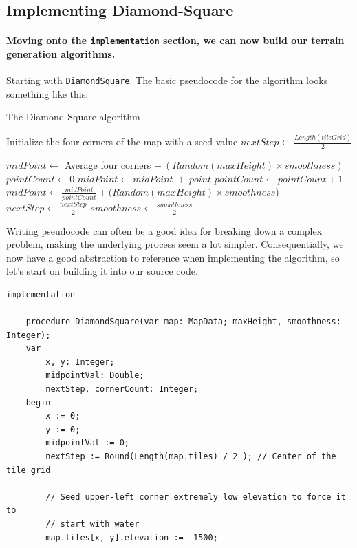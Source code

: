\documentclass{article}
\begin{document}
\pagebreak


\subsection{Implementing Diamond-Square}

\paragraph{Moving onto the \texttt{implementation} section, we can now build our terrain generation algorithms.} Starting with \texttt{DiamondSquare}. The basic pseudocode for the algorithm looks something like this:

\begin{algorithm}[H]
\caption{The Diamond-Square algorithm}
\begin{algorithmic}
	\State Initialize the four corners of the map with a seed value
	\State $nextStep \gets \frac{Length(tileGrid)}{2}$
	
		  
			\State $midPoint \gets$ Average four corners $+ \ (Random(maxHeight) \times smoothness)$
		\EndFor
		 
				\State $pointCount \gets 0$
					\State $midPoint \gets midPoint \ + \ point$
					\State $pointCount\gets pointCount+1$
				\EndIf
			\EndFor
			\State $midPoint \gets \frac{midPoint}{pointCount} + (Random(maxHeight) \times smoothness$)
		\EndFor
		\State $nextStep \gets \frac{nextStep}{2}$ 
		\State $smoothness \gets \frac{smoothness}{2}$ 
	\EndWhile
	
\EndProcedure	
\end{algorithmic}
\end{algorithm}

Writing pseudocode can often be a good idea for breaking down a complex problem, making the underlying process seem a lot simpler. Consequentially, we now have a good abstraction to reference when implementing the algorithm, so let's start on building it into our source code.

\begin{verbatim}
implementation

	procedure DiamondSquare(var map: MapData; maxHeight, smoothness: Integer);
	var
		x, y: Integer;
		midpointVal: Double;
		nextStep, cornerCount: Integer;
	begin
		x := 0;
		y := 0;
		midpointVal := 0;
		nextStep := Round(Length(map.tiles) / 2 ); // Center of the tile grid

		// Seed upper-left corner extremely low elevation to force it to
		// start with water
		map.tiles[x, y].elevation := -1500;
\end{verbatim}
\end{document}
